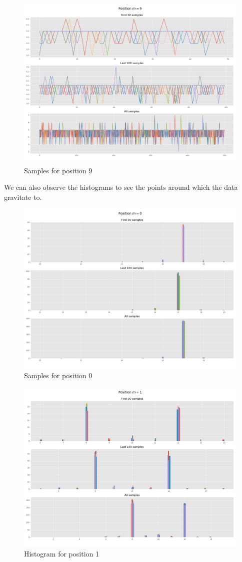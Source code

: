 \documentclass[]{article}
\begin{document}
	\begin{figure}[H]
		\begin{center}
			
			\includegraphics[width=.5\textwidth]{task4/figures/T_2_4/Q2/convergence_pos9.png}
			\caption*{Samples for position 9}
		\end{center}
	\end{figure}
	
	\newpage
	
	We can also observe the histograms to see the points around which the data gravitate to.
	
	\begin{figure}[H]
		\begin{center}
			
			\includegraphics[width=.5\textwidth]{task4/figures/T_2_4/Q2/distribution_pos0.png}
			\caption*{Samples for position 0}
		\end{center}
	\end{figure}
	
	\begin{figure}[H]
		\begin{center}
			
			\includegraphics[width=.5\textwidth]{task4/figures/T_2_4/Q2/distribution_pos1.png}
			\caption*{Histogram for position 1}
		\end{center}
	\end{figure}
	
\end{document}
